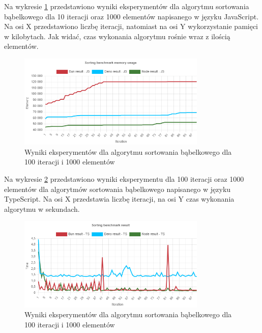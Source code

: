 Na wykresie \ref{fig:quick_sorting_e2_memory_js} przedstawiono wyniki eksperymentów dla algorytmu sortowania bąbelkowego dla 10 iteracji oraz 1000 elementów napisanego w języku JavaScript. Na osi X przedstawiono liczbę iteracji, natomiast na osi Y wykorzystanie pamięci w kilobytach. Jak widać, czas wykonania algorytmu rośnie wraz z ilością elementów.
\begin{figure}[H]
  \centering
  \includegraphics[width=0.8\textwidth]{Figures/sorting/quick/e2_memory_js.png}
  \caption{Wyniki eksperymentów dla algorytmu sortowania bąbelkowego dla 100 iteracji i 1000 elementów}
  \label{fig:quick_sorting_e2_memory_js}
\end{figure}

Na wykresie \ref{fig:quick_sorting_e2_ts} przedstawiono wyniki eksperymentu dla 100 iteracji oraz 1000 elementów dla algorytmów sortowania bąbelkowego napisanego w języku TypeScript. Na osi X przedstawia liczbę iteracji, na osi Y czas wykonania algorytmu w sekundach. 

\begin{figure}[H]
  \centering
  \includegraphics[width=0.8\textwidth]{Figures/sorting/quick/e2_ts.png}
  \caption{Wyniki eksperymentów dla algorytmu sortowania bąbelkowego dla 100 iteracji i 1000 elementów}
  \label{fig:quick_sorting_e2_ts}
\end{figure}

